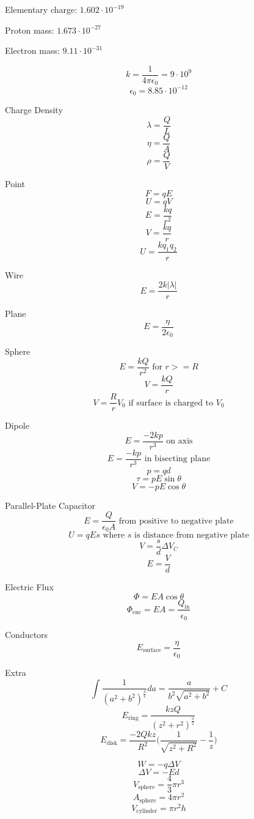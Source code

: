 \documentclass[twocolumn]{article}
\begin{document}
Elementary charge: $1.602\cdot 10^{-19}$

Proton mass: $1.673\cdot 10^{-27}$

Electron mass: $9.11\cdot 10^{-31}$

\[k=\frac{1}{4\pi\epsilon_0}=9\cdot 10^9\]
\[\epsilon_0=8.85\cdot 10^{-12}\]

Charge Density
\[\lambda = \frac{Q}{L}\]
\[\eta = \frac{Q}{A}\]
\[\rho = \frac{Q}{V}\]

Point
\[F=qE\]
\[U=qV\]
\[E=\frac{kq}{r^2}\]
\[V=\frac{kq}{r}\]
\[U=\frac{kq_1q_2}{r}\]

Wire
\[E=\frac{2k|\lambda |}{r}\]

Plane
\[E=\frac{\eta}{2\epsilon_0}\]

Sphere
\[E=\frac{kQ}{r^2}\text{ for }r >= R\]
\[V=\frac{kQ}{r}\]
\[V=\frac{R}{r}V_0\text{ if surface is charged to }V_0\]

Dipole
\[E=\frac{-2kp}{r^3}\text{ on axis}\]
\[E=\frac{-kp}{r^3}\text{ in bisecting plane}\]
\[p=qd\]
\[\tau =pE\sin\theta\]
\[V=-pE\cos\theta\]

Parallel-Plate Capacitor
\[E=\frac{Q}{\epsilon_0 A}\text{ from positive to negative plate}\]
\[U=qEs\text{ where $s$ is distance from negative plate}\]
\[V=\frac{s}{d}\Delta V_C\]
\[E=\frac{V}{d}\]

Electric Flux
\[\Phi = EA\cos\theta\]
\[\Phi_\text{enc}=EA=\frac{Q_\text{in}}{\epsilon_0}\]

Conductors
\[E_\text{surface}=\frac{\eta}{\epsilon_0}\]

Extra
\[\int \frac{1}{(a^2+b^2)^\frac{3}{2}}da=\frac{a}{b^2 \sqrt{a^2+b^2}}+C\]
\[E_\text{ring}=\frac{kzQ}{(z^2+r^2)^\frac{3}{2}}\]
\[E_\text{disk}=\frac{-2Qkz}{R^2}\Big(\frac{1}{\sqrt{z^2+R^2}}-\frac{1}{z}\Big)\]

\[W=-q\Delta V\]
\[\Delta V=-Ed\]
\[V_\text{sphere}=\frac{4}{3}\pi r^3\]
\[A_\text{sphere}=4\pi r^2\]
\[V_\text{cylinder}=\pi r^2 h\]
\end{document}
